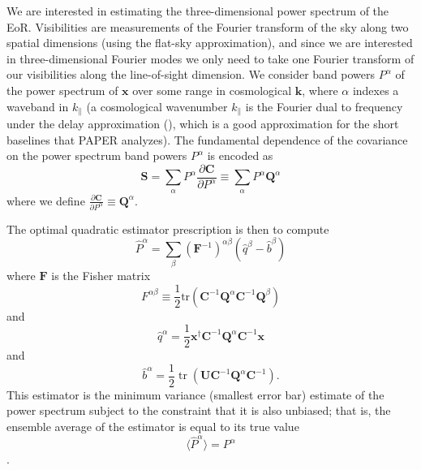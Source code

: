 \documentclass[preprint2,numberedappendix,tighten]{aastex6}  %
\newcommand{\C}{\mathbf{C}}
\newcommand{\F}{\mathbf{F}}
\newcommand{\invC}{\ensuremath{\C^{-1}}}
\DeclareMathOperator{\Tr}{tr}
\newcommand{\half}{\ensuremath{\frac{1}{2}}}
\begin{document}
We are interested in estimating the three-dimensional power spectrum of the EoR.  
Visibilities are measurements of the Fourier transform of the sky along two spatial dimensions (using the flat-sky approximation), and since we are interested in three-dimensional Fourier modes we only need to take one Fourier transform of our visibilities along the line-of-sight dimension.  We consider band powers $P^\alpha$ of the power spectrum of $\textbf{x}$ over some range in cosmological $\mathbf{k}$, where $\alpha$ indexes a waveband in $k_{\parallel}$ (a cosmological wavenumber $k_{\parallel}$ is the Fourier dual to frequency under the delay approximation (\citealt{parsons_et_al2012b}), which is a good approximation for the short baselines that PAPER analyzes).  The fundamental dependence of the covariance on the power spectrum band powers $P^\alpha$ is encoded as 
\begin{equation}
\textbf{S} = \sum_\alpha P^\alpha \frac{\partial\textbf{C}}{\partial P^\alpha} \equiv \sum_\alpha P^\alpha \textbf{Q}^\alpha
\end{equation}
where we define $\frac{\partial\textbf{C}}{\partial P^\alpha} \equiv \textbf{Q}^{\alpha}$.

The optimal quadratic estimator prescription is then to compute
\begin{equation}
\label{eq:OQE}
\widehat{P}^{\alpha}  = \sum_\beta ({\F^{-1}})^{\alpha\beta} (\widehat{q}^{\beta} - \widehat{b}^{\beta} )
\end{equation}
where $\F$ is the Fisher matrix 
\begin{equation}
F^{\alpha \beta} \equiv \frac{1}{2} \textrm{tr} \left( \C^{-1} \textbf{Q}^{\alpha} \C^{-1} \textbf{Q}^{\beta} \right)
\end{equation}
and
\begin{equation}
\label{eq:OQEQuadratic}
\widehat{q}^\alpha =  \half \textbf{x}^\dagger \invC \textbf{Q}^{\alpha}  \invC \textbf{x} 
\end{equation}
and
\begin{equation}
\label{eq:OQELinear}
\widehat{b}^{\alpha} = \half \Tr\left( \mathbf{U} \invC \textbf{Q}^{\alpha} \invC \right).
\end{equation}
This estimator is the minimum variance (smallest error bar) estimate of the power spectrum  subject to the constraint that it is also unbiased; that is, the ensemble average of the estimator is equal to its true value
\begin{equation}
\label{eq:super_unbiased}
\langle \widehat{P}^{\alpha} \rangle = P^\alpha
\end{equation}
\citep{tegmark_et_al1997a,bond_et_al1998}.
\end{document}
